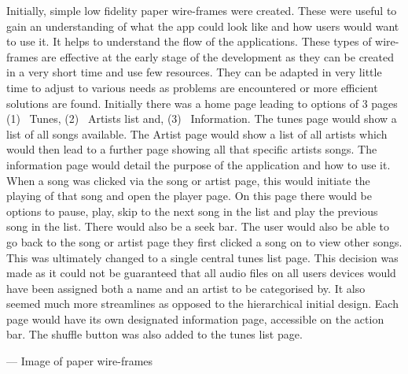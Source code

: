 \documentclass{l4proj}
\begin{document}
Initially, simple low fidelity paper wire-frames were created. These were useful to gain an understanding of what the app could look like and how users would want to use it. It helps to understand the flow of the applications. These types of wire-frames are effective at the early stage of the development as they can be created in a very short time and use few resources. They can be adapted in very little time to adjust to various needs as problems are encountered or more efficient solutions are found. Initially there was a home page leading to options of 3 pages (1)~ Tunes, (2)~ Artists list and, (3)~ Information. The tunes page would show a list of all songs available. The Artist page would show a list of all artists which would then lead to a further page showing all that specific artists songs. The information page would detail the purpose of the application and how to use it. When a song was clicked via the song or artist page, this would initiate the playing of that song and open the player page. On this page there would be options to pause, play, skip to the next song in the list and play the previous song in the list. There would also be a seek bar. The user would also be able to go back to the song or artist page they first clicked a song on to view other songs. This was ultimately changed to a single central tunes list page. This decision was made as it could not be guaranteed that all audio files on all users devices would have been assigned both a name and an artist to be categorised by. It also seemed much more streamlines as opposed to the hierarchical initial design. Each page would have its own designated information page, accessible on the action bar. The shuffle button was also added to the tunes list page.

--- Image of paper wire-frames
\end{document}
